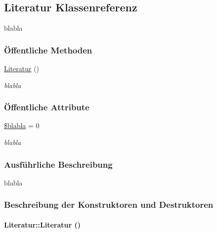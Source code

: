 \hypertarget{classLiteratur}{
\subsection{Literatur Klassenreferenz}
\label{classLiteratur}
}
blabla  


\subsubsection*{\"{O}ffentliche Methoden}
\begin{CompactItemize}
\item 
\hyperlink{classLiteratur_a647da0a0e560f17321c76207e5f5a03}{Literatur} ()
\begin{CompactList}\small\item\em blabla \item\end{CompactList}\end{CompactItemize}
\subsubsection*{\"{O}ffentliche Attribute}
\begin{CompactItemize}
\item 
\hyperlink{classLiteratur_1fd31a583c0ffffd05d2ec492a357ec7}{\$blabla} = 0
\begin{CompactList}\small\item\em blabla \item\end{CompactList}\end{CompactItemize}


\subsubsection{Ausf\"{u}hrliche Beschreibung}
blabla 



\subsubsection{Beschreibung der Konstruktoren und Destruktoren}
\hypertarget{classLiteratur_a647da0a0e560f17321c76207e5f5a03}{
\paragraph[Literatur]{\setlength{\rightskip}{0pt plus 5cm}Literatur::Literatur ()}\hfill}
\label{classLiteratur_a647da0a0e560f17321c76207e5f5a03}


